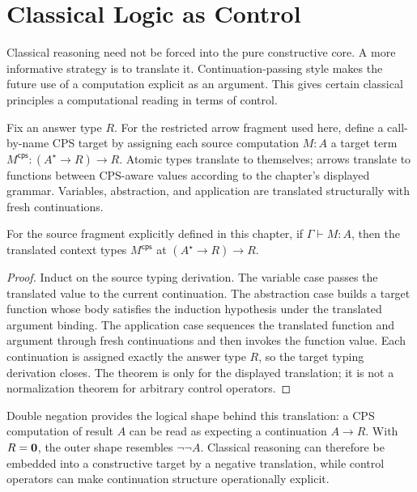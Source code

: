 \chapter{Classical Logic as Control}
\label{ch:classical-control}

Classical reasoning need not be forced into the pure constructive core. A more informative strategy is to translate it. Continuation-passing style makes the future use of a computation explicit as an argument. This gives certain classical principles a computational reading in terms of control.

Fix an answer type $R$. For the restricted arrow fragment used here, define a call-by-name CPS target by assigning each source computation $M:A$ a target term $M^{\mathsf{cps}}:(A^\star\to R)\to R$. Atomic types translate to themselves; arrows translate to functions between CPS-aware values according to the chapter's displayed grammar. Variables, abstraction, and application are translated structurally with fresh continuations.



\begin{theorem}
For the source fragment explicitly defined in this chapter, if $\Gamma\vdash M:A$, then the translated context types $M^{\mathsf{cps}}$ at $(A^\star\to R)\to R$.
\end{theorem}
\begin{proof}
Induct on the source typing derivation. The variable case passes the translated value to the current continuation. The abstraction case builds a target function whose body satisfies the induction hypothesis under the translated argument binding. The application case sequences the translated function and argument through fresh continuations and then invokes the function value. Each continuation is assigned exactly the answer type $R$, so the target typing derivation closes. The theorem is only for the displayed translation; it is not a normalization theorem for arbitrary control operators.
\end{proof}

Double negation provides the logical shape behind this translation: a CPS computation of result $A$ can be read as expecting a continuation $A\to R$. With $R=\mathbf{0}$, the outer shape resembles $\neg\neg A$. Classical reasoning can therefore be embedded into a constructive target by a negative translation, while control operators can make continuation structure operationally explicit.

